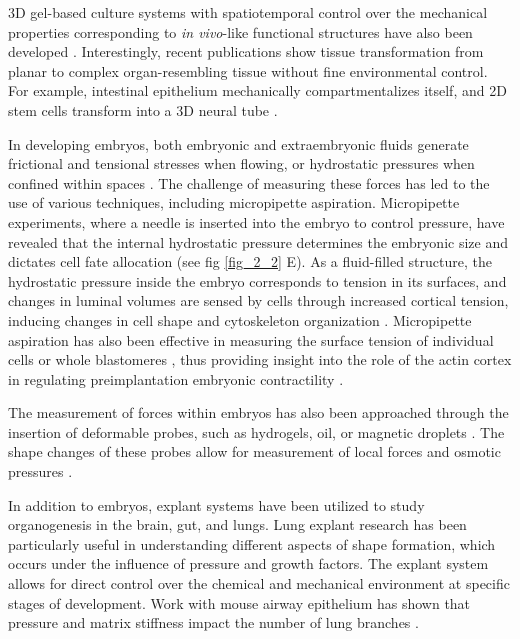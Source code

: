 3D gel-based culture systems with spatiotemporal control over the mechanical properties corresponding to \textit{in vivo}-like functional structures have also been developed \cite{torras2018}. Interestingly, recent publications show tissue transformation from planar to complex organ-resembling tissue without fine environmental control. For example, intestinal epithelium mechanically compartmentalizes itself, and 2D stem cells transform into a 3D neural tube \cite{perez-gonzalez2021, karzbrun2021}.

In developing embryos, both embryonic and extraembryonic fluids generate frictional and tensional stresses when flowing, or hydrostatic pressures when confined within spaces \cite{vianello2019, chan2020}. The challenge of measuring these forces has led to the use of various techniques, including micropipette aspiration. Micropipette experiments, where a needle is inserted into the embryo to control pressure, have revealed that the internal hydrostatic pressure determines the embryonic size and dictates cell fate allocation \cite{chan2019} (see fig \ref{fig_2_2} E). As a fluid-filled structure, the hydrostatic pressure inside the embryo corresponds to tension in its surfaces, and changes in luminal volumes are sensed by cells through increased cortical tension, inducing changes in cell shape and cytoskeleton organization \cite{chan2019, choudhury2022}. Micropipette aspiration has also been effective in measuring the surface tension of individual cells or whole blastomeres \cite{dumortier2019}, thus providing insight into the role of the actin cortex in regulating preimplantation embryonic contractility \cite{ozguc2022, firmin2022}.

The measurement of forces within embryos has also been approached through the insertion of deformable probes, such as hydrogels, oil, or magnetic droplets \cite{dolega2017, campas2014, serwane2017}. The shape changes of these probes allow for measurement of local forces and osmotic pressures \cite{mongera2023}.

In addition to embryos, explant systems have been utilized to study organogenesis in the brain, gut, and lungs. Lung explant research has been particularly useful in understanding different aspects of shape formation, which occurs under the influence of pressure and growth factors. The explant system allows for direct control over the chemical and mechanical environment at specific stages of development. Work with mouse airway epithelium has shown that pressure and matrix stiffness impact the number of lung branches \cite{palmer2021, varner2015, nelson2017}.


